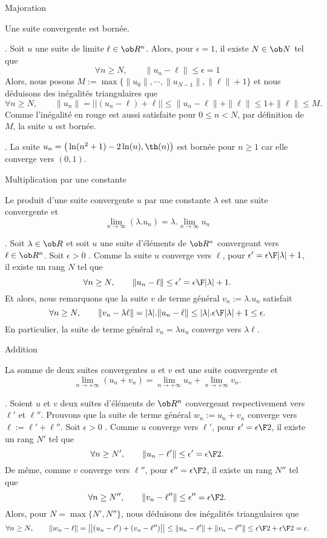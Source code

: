 \Concept [Index=Suites!limites!majoration] Majoration

\Propriete 
Une suite convergente est bornée. 

\Demonstration. Soit $u$ une suite de limite $\ell\in\ob R^n$. Alors, pour $\epsilon=1$, il existe $N\in\ob N$ tel que 
$$
\forall n\ge N, \qquad \|u_n-\ell\|\le \epsilon=1
$$
Alors, nous posons $M:=\max\{\|u_0\|,\cdots, \|u_{N-1}\|, \|\ell\|+1\}$ et nous déduisons des inégalités triangulaires que 
$$
 \forall n\ge N , \qquad {\|u_n\|}=\big|\big|(u_n-\ell)+\ell\big|\big|\le \|u_n-\ell\|+\|\ell\|\le 1+\|\ell\|{\le M}. 
$$
Comme l'inégalité en rouge est aussi satisfaite pour $0\le n<N$, par définition de $M$, la suite $u$ est bornée. 
\CQFD

\Exemple. La suite $u_n= \big(\ln(n^2+1)-2\ln(n), \th(n)\big)$ est bornée pour $n\ge1$ car elle converge vers $(0, 1)$. 


\Concept [Index=Suites!limites!produit par un scalaire] Multiplication par une constante

Le produit d'une suite convergente $u$ par une constante $\lambda$ est une suite convergente et 
$$
\lim_{n\to\infty}(\lambda.u_n)=\lambda.\lim_{n\to\infty}u_n
$$

\Demonstration. Soit $\lambda\in\ob R$ et soit $u$ une suite d'éléments de $\ob R^n$ convergeant vers $\ell\in\ob R^n$. 
\pn
Soit $\epsilon>0$ . Comme la suite $u$ converge vers $\ell$, pour $\epsilon'={\epsilon\F|\lambda|+1}$,  il existe un
rang $N$ tel que $$ \forall n\ge N, \qquad \|u_n-\ell\|\le \epsilon'={\epsilon\F |\lambda|+1}.  $$ Et alors, nous remarquons
que la suite $v$ de terme général $v_n:=\lambda.u_n$ satisfait $$  \forall n\ge N,  \qquad  \|v_n-
\lambda\ell\|=|\lambda|.\|u_n-\ell\|\le |\lambda|.{\epsilon\F|\lambda|+1} \le\epsilon . $$ En particulier, la suite de
terme général $v_n=\lambda u_n$ converge vers $\lambda\ell$.  \CQFD

\Concept [Index=Suites!limites!addition] Addition

La somme de deux suites convergentes $u$ et $v$ est une suite convergente et 
$$
\lim_{n\to+\infty}(u_n+v_n)=\lim_{n\to+\infty}u_n+\lim_{n\to+\infty}v_n.
$$

\Demonstration. Soient $u$ et $v$ deux suites d'éléments de $\ob R^n$ convergeant respectivement vers $\ell'$ et $\ell''$. 
Prouvons que la suite de terme général $w_n:=u_n+v_n$ converge vers $\ell:=\ell'+\ell''$. \pn 
 Soit $\epsilon>0$ . Comme $u$ converge vers $\ell'$, pour $\epsilon'={\epsilon\F2}$,  il existe un rang $N'$  tel que 
$$
\forall n\ge N', \qquad \|u_n-\ell'\|\le \epsilon'={\epsilon\F2}. 
$$
De même, comme $v$ converge vers $\ell''$, pour $\epsilon''={\epsilon\F2}$,  il existe un rang $N''$  tel que 
$$
\forall n\ge N'', \qquad \|v_n-\ell''\|\le \epsilon''={\epsilon\F2}. 
$$
Alors,  pour $N=\max\{N',N''\}$, nous déduisons des inégalités triangulaires que 
$$
\forall n\ge N , \qquad \|w_n-\ell\| =\big|\big|(u_n-\ell')+(v_n-\ell'')\big|\big|\le \|u_n-\ell'\|+\|v_n-\ell''\|\le
{\epsilon\F 2}+{\epsilon\F2}=\epsilon. 
$$ \CQFD


